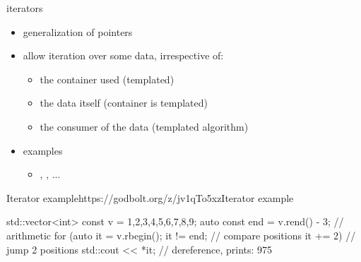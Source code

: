 \begin{frame}[fragile]
  \begin{block}{iterators}
    \begin{itemize}
    \item generalization of pointers
    \item allow iteration over some data, irrespective of:
      \begin{itemize}
      \item the container used (templated)
      \item the data itself (container is templated)
      \item the consumer of the data (templated algorithm)
      \end{itemize}
    \item examples
      \begin{itemize}
        \item {}, , ...
      \end{itemize}
    \end{itemize}
  \end{block}
  \begin{exampleblockGB}{Iterator example}{https://godbolt.org/z/jv1qTo5xz}{Iterator example}
    \begin{cppcode*}{}
      std::vector<int> const v = {1,2,3,4,5,6,7,8,9};
      auto const end = v.rend() - 3; // arithmetic
      for (auto it = v.rbegin();
           it != end;     // compare positions
           it += 2)       // jump 2 positions
        std::cout << *it; // dereference, prints: 975
    \end{cppcode*}
  \end{exampleblockGB}
\end{frame}

